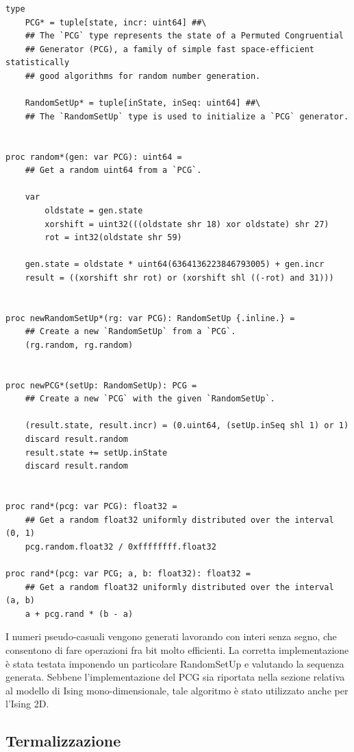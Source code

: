 \begin{verbatim}
type 
    PCG* = tuple[state, incr: uint64] ##\
    ## The `PCG` type represents the state of a Permuted Congruential 
    ## Generator (PCG), a family of simple fast space-efficient statistically 
    ## good algorithms for random number generation.

    RandomSetUp* = tuple[inState, inSeq: uint64] ##\
    ## The `RandomSetUp` type is used to initialize a `PCG` generator.


proc random*(gen: var PCG): uint64 =
    ## Get a random uint64 from a `PCG`.

    var 
        oldstate = gen.state
        xorshift = uint32(((oldstate shr 18) xor oldstate) shr 27)
        rot = int32(oldstate shr 59)

    gen.state = oldstate * uint64(6364136223846793005) + gen.incr
    result = ((xorshift shr rot) or (xorshift shl ((-rot) and 31)))


proc newRandomSetUp*(rg: var PCG): RandomSetUp {.inline.} = 
    ## Create a new `RandomSetUp` from a `PCG`.
    (rg.random, rg.random)


proc newPCG*(setUp: RandomSetUp): PCG = 
    ## Create a new `PCG` with the given `RandomSetUp`.

    (result.state, result.incr) = (0.uint64, (setUp.inSeq shl 1) or 1)
    discard result.random
    result.state += setUp.inState
    discard result.random


proc rand*(pcg: var PCG): float32 =
    ## Get a random float32 uniformly distributed over the interval (0, 1)
    pcg.random.float32 / 0xffffffff.float32

proc rand*(pcg: var PCG; a, b: float32): float32 =
    ## Get a random float32 uniformly distributed over the interval (a, b)
    a + pcg.rand * (b - a)
\end{verbatim}    

I numeri pseudo-casuali vengono generati lavorando con interi senza segno, che consentono di fare operazioni fra bit molto efficienti. 
La corretta implementazione è stata testata imponendo un particolare RandomSetUp e valutando la sequenza generata. Sebbene l'implementazione 
del PCG sia riportata nella sezione relativa al modello di Ising mono-dimensionale, tale algoritmo è stato utilizzato anche per l'Ising 2D.



\subsection{Termalizzazione}

